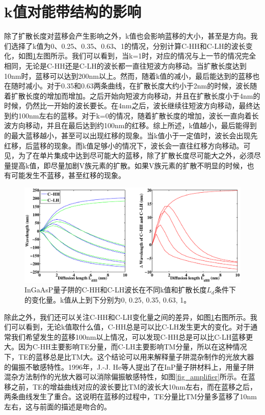 \documentclass[oneside]{ZJUthesis}
\begin{document}
\section{k值对能带结构的影响}

除了扩散长度对蓝移会产生影响之外，k值也会影响蓝移的大小，甚至是方向。我们选择了k值为0、0.25、0.35、0.63、1的情况，分别计算C-HH和C-LH的波长变化，如图\ref{fig_k}左图所示。我们可以看到，当k=1时，对应的情况与上一节的情况完全相同，无论是C-HH还是C-LH的波长都一直往短波方向移动。当扩散长度达到10nm时，蓝移可以达到200nm以上。然而，随着k值的减小，最后能达到的蓝移也在随时减小。对于0.35和0.63两条曲线，在扩散长度大约小于2nm的时候，波长随着扩散长度的增加而增加。之后开始向短波方向移动，并且在扩散长度小于4nm的时候，仍然比一开始的波长要长。在4nm之后，波长继续往短波方向移动，最终达到约100nm左右的蓝移。对于k=0的情况，随着扩散长度的增加，波长一直向着长波方向移动，并且在最后达到约100nm的红移。综上所述，k值越小，最后能得到的最大蓝移越小，甚至可以出现红移的现象。当k值小于一定值时，波长会出现先红移，后蓝移的现象。而k值足够小的情况下，波长会一直往红移方向移动。可见，为了在单片集成中达到尽可能大的蓝移，除了扩散长度尽可能大之外，必须尽量提高k值，即尽量加剧V族元素的扩散。如果V族元素的扩散不明显的时候，也有可能发生不蓝移，甚至红移的现象。

\begin{figure}[!t]
    \centering
    \includegraphics[width=1.0\textwidth]{./Pictures/k.eps}
    \caption{InGaAsP量子阱的C-HH和C-LH波长在不同k值和扩散长度$L_d$条件下的变化量。k值从上到下分别为0, 0.25, 0.35, 0.63, 1。}
    \label{fig_k}
\end{figure}

除此之外，我们还可以关注C-HH和C-LH变化量之间的差异，如图\ref{fig_k}右图所示。我们可以看到，无论k值取什么值，C-HH总是可以比C-LH发生更大的变化。对于通常我们希望发生的蓝移100nm以上情况，可以发现C-HH总是可以比C-LH蓝移更大。因为C-HH主要影响TE分量，而C-LH主要影响TM分量，所以在这种情况下，TE的蓝移总是比TM大。这个结论可以用来解释量子阱混杂制作的光放大器的偏振不敏感特性。1996年，J.-J. He等人提出了在InP量子阱材料上，用量子阱混杂方法制作的光放大器可以消除偏振敏感特性\cite{He1996Polarization}，如图\ref{fig_amplifier}所示。在蓝移之前，TE的增益曲线对应的波长要比TM的波长大10nm左右，而在蓝移之后，两条曲线发生了重合。这说明在蓝移的过程中，TE分量比TM分量多蓝移了10nm左右，这与前面的描述是吻合的。
\end{document}
